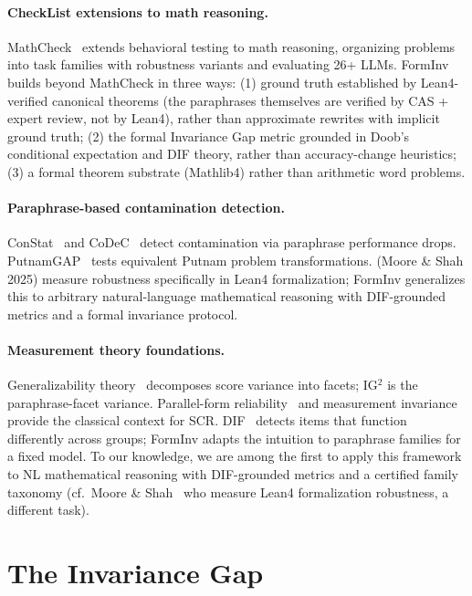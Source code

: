 \documentclass{article}
\begin{document}
\paragraph{CheckList extensions to math reasoning.}
MathCheck~\citep{zhou2024mathcheck} extends behavioral testing to math reasoning,
organizing problems into task families with robustness variants and evaluating 26+ LLMs.
FormInv builds beyond MathCheck in three ways:
(1) ground truth established by Lean4-verified canonical theorems (the paraphrases themselves
are verified by CAS + expert review, not by Lean4), rather than approximate rewrites with implicit ground truth;
(2) the formal Invariance Gap metric grounded in Doob's conditional expectation and DIF theory,
rather than accuracy-change heuristics;
(3) a formal theorem substrate (Mathlib4) rather than arithmetic word problems.

\paragraph{Paraphrase-based contamination detection.}
ConStat~\citep{dekoninck2024constat} and CoDeC~\citep{zawalski2025codec} detect contamination
via paraphrase performance drops.
PutnamGAP~\citep{hao2025putnambench} tests equivalent Putnam problem transformations.
\citet{arxiv2511} (Moore \& Shah 2025) measure robustness specifically in Lean4 formalization;
FormInv generalizes this to arbitrary natural-language mathematical reasoning with DIF-grounded metrics and a formal invariance protocol.

\paragraph{Measurement theory foundations.}
Generalizability theory~\citep{cronbach1972} decomposes score variance into facets; IG$^2$ is the paraphrase-facet variance.
Parallel-form reliability~\citep{lord1968} and measurement invariance~\citep{vandenberg2000} provide the classical context for SCR.
DIF~\citep{holland1988} detects items that function differently across groups; FormInv adapts the intuition to paraphrase families for a fixed model.
To our knowledge, we are among the first to apply this framework to NL mathematical reasoning with DIF-grounded metrics and a certified family taxonomy (cf.\ Moore \& Shah~\citep{arxiv2511} who measure Lean4 formalization robustness, a different task).

\section{The Invariance Gap}
\label{sec:ig}
\end{document}
